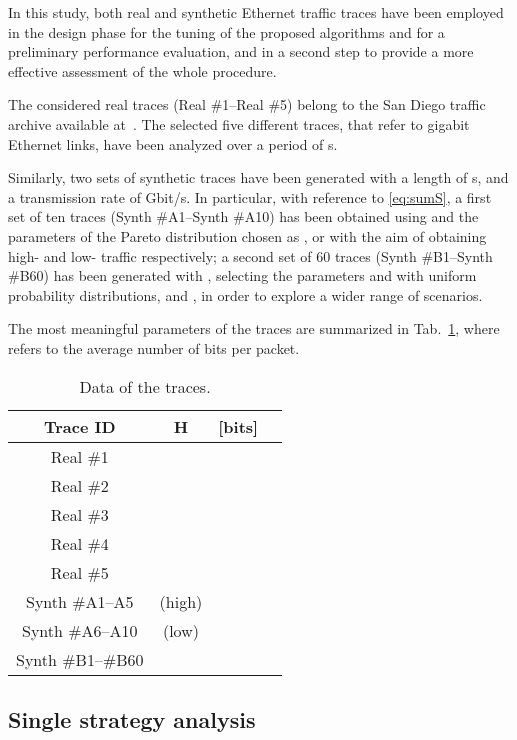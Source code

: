 \documentclass[journal,10pt,twoside,final]{IEEEtran}
\begin{document}
In this study, both real and synthetic Ethernet traffic traces have been employed in the design phase for the tuning of the proposed algorithms and for a preliminary performance evaluation, and in a second step to provide a more effective assessment of the whole procedure.

The considered real traces (Real \#1--Real \#5) belong to the San Diego traffic archive available at~\cite{tracce2}. The selected five different traces, that refer to gigabit  Ethernet links, have been analyzed over a period of  s. 

Similarly, two sets of synthetic traces have been generated with a length of  s, and a transmission rate of  Gbit/s. In particular, with reference to \eqref{eq:sumS}, a first set of ten traces (Synth \#A1--Synth \#A10) has been obtained using  and the parameters of the Pareto distribution chosen as ,  or  with the aim of obtaining high- and low- traffic respectively; a second set of 60 traces (Synth \#B1--Synth \#B60) has been generated with , selecting the parameters  and  with uniform probability distributions,  and , in order to explore a wider range of scenarios.

The most meaningful parameters of the traces are summarized in Tab.~\ref{tab:data}, where  refers to the average number of bits per packet.

\begin{table}[h]
\caption{Data of the traces.}
\label{tab:data}
\begin{center}
\begin{tabular}{|c|c|c|c|}
\hline 
Trace ID & H &   [bits] \\                         
\hline 
\hline 
Real \#1 &  &  \\
Real \#2 &  &  \\
Real \#3 &  &  \\
Real \#4 &  &  \\
Real \#5 &  &  \\
\hline
\hline 
Synth \#A1--A5 &  (high) &  \\
Synth \#A6--A10 &  (low) & \\
\hline 
\hline
Synth \#B1--\#B60 &  & \\
\hline
\end{tabular} 
\end{center}
\end{table}






\subsection{Single strategy analysis}
\label{sec:singleWindowAnalysis}
\end{document}
